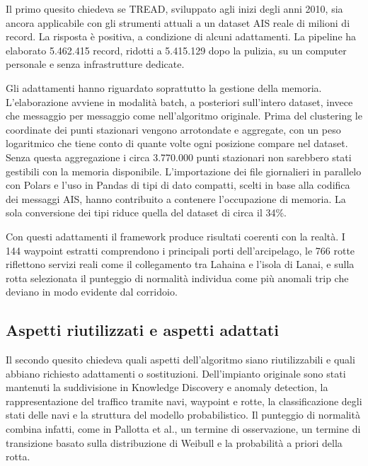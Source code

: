 Il primo quesito chiedeva se TREAD, sviluppato agli inizi degli anni 2010, sia ancora applicabile
con gli strumenti attuali a un dataset AIS reale di milioni di record. La risposta è positiva,
a condizione di alcuni adattamenti. La pipeline ha elaborato 5.462.415 record, ridotti a 5.415.129
dopo la pulizia, su un computer personale e senza infrastrutture dedicate.

Gli adattamenti hanno riguardato soprattutto la gestione della memoria. L'elaborazione avviene in
modalità batch, a posteriori sull'intero dataset, invece che messaggio per messaggio come
nell'algoritmo originale. Prima del clustering le coordinate dei punti stazionari vengono
arrotondate e aggregate, con un peso logaritmico che tiene conto di quante volte ogni posizione
compare nel dataset. Senza questa aggregazione i circa 3.770.000 punti stazionari non sarebbero
stati gestibili con la memoria disponibile. L'importazione dei file giornalieri in parallelo con
Polars e l'uso in Pandas di tipi di dato compatti, scelti in base alla codifica dei messaggi AIS,
hanno contribuito a contenere l'occupazione di memoria. La sola conversione dei tipi riduce quella
del dataset di circa il 34\%.

Con questi adattamenti il framework produce risultati coerenti con la realtà. I 144 waypoint
estratti comprendono i principali porti dell'arcipelago, le 766 rotte riflettono servizi reali come
il collegamento tra Lahaina e l'isola di Lanai, e sulla rotta selezionata il punteggio di normalità
individua come più anomali trip che deviano in modo evidente dal corridoio.

\subsection[Aspetti riutilizzati e aspetti adattati]{Aspetti riutilizzati e aspetti adattati}

Il secondo quesito chiedeva quali aspetti dell'algoritmo siano riutilizzabili e quali abbiano
richiesto adattamenti o sostituzioni. Dell'impianto originale sono stati mantenuti la suddivisione
in Knowledge Discovery e anomaly detection, la rappresentazione del traffico tramite navi,
waypoint e rotte, la classificazione degli stati delle navi e la struttura del modello
probabilistico. Il punteggio di normalità combina infatti, come in Pallotta et al., un termine di
osservazione, un termine di transizione basato sulla distribuzione di Weibull e la probabilità
a priori della rotta.

